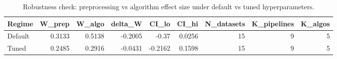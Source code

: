 \begin{table}
\caption{Robustness check: preprocessing vs algorithm effect size under default vs tuned hyperparameters.}
\label{tab:default_vs_tuned}
\begin{tabular}{lrrrrrrrr}
\toprule
Regime & W\_prep & W\_algo & delta\_W & CI\_lo & CI\_hi & N\_datasets & K\_pipelines & K\_algos \\
\midrule
Default & 0.3133 & 0.5138 & -0.2005 & -0.37 & 0.0256 & 15 & 9 & 5 \\
Tuned & 0.2485 & 0.2916 & -0.0431 & -0.2162 & 0.1598 & 15 & 9 & 5 \\
\bottomrule
\end{tabular}
\end{table}
